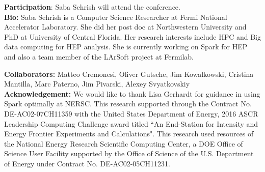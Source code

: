 \documentclass[10pt, twocolumn]{article}
\newcommand{\squeezeup}{\vspace{-5.5mm}}
\begin{document}
\textbf{Participation}: Saba Sehrish will attend the conference. \\

\textbf{Bio:} 
Saba Sehrish is a Computer Science Researcher 
at Fermi National Accelerator Laboratory. She did her post doc at Northwestern University
and PhD at University of Central Florida. 
Her research interests include HPC and Big data computing for HEP analysis.  
She is currently working on Spark for HEP and also a team member of the LArSoft 
project at Fermilab. 

\textbf{Collaborators: } 
Matteo Cremonesi, Oliver Gutsche, Jim Kowalkowski, 
Cristina Mantilla, Marc Paterno, Jim Pivarski, Alexey Svyatkovskiy\\

\textbf{Acknowledgement: }
We would like to thank Lisa Gerhardt for guidance in using Spark optimally at NERSC. 
This research supported through the  Contract No. DE-AC02-07CH11359 with the United States Department of Energy, 2016 ASCR Leadership Computing Challenge award titled ``An End-Station for Intensity and Energy Frontier Experiments and Calculations". This research used resources of the National Energy Research Scientific Computing Center, a DOE Office of Science User Facility supported by the Office of Science of the U.S. Department of Energy under Contract No. DE-AC02-05CH11231.
\scriptsize


\end{document}
